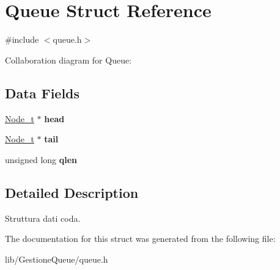 \hypertarget{struct_queue}{}\section{Queue Struct Reference}
\label{struct_queue}


{\ttfamily \#include $<$queue.\+h$>$}



Collaboration diagram for Queue\+:
\subsection*{Data Fields}
\begin{DoxyCompactItemize}
\item 
\mbox{\label{struct_queue_aab355c5320dd0e9b2522141171a933d2}} 
\hyperlink{struct_node}{Node\+\_\+t} $\ast$ {\bfseries head}
\item 
\mbox{\label{struct_queue_aca42aff10804c6229eae05f67c7cc6d7}} 
\hyperlink{struct_node}{Node\+\_\+t} $\ast$ {\bfseries tail}
\item 
\mbox{\label{struct_queue_a482338c134f3d21628d7529694e38423}} 
unsigned long {\bfseries qlen}
\end{DoxyCompactItemize}


\subsection{Detailed Description}
Struttura dati coda. 

The documentation for this struct was generated from the following file\+:\begin{DoxyCompactItemize}
\item 
lib/\+Gestione\+Queue/queue.\+h\end{DoxyCompactItemize}
